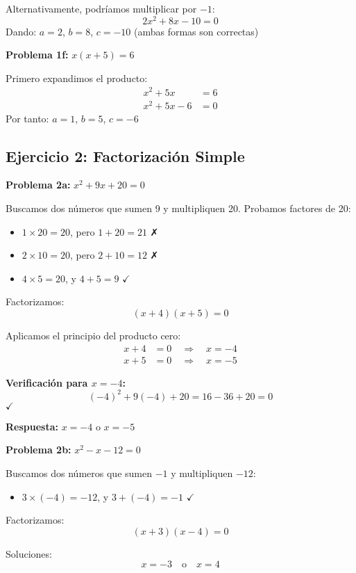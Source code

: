 Alternativamente, podríamos multiplicar por $-1$:
$$2x^2 + 8x - 10 = 0$$
Dando: $a = 2$, $b = 8$, $c = -10$ (ambas formas son correctas)

\textbf{Problema 1f:} $x(x + 5) = 6$

Primero expandimos el producto:
\begin{align}
x^2 + 5x &= 6\\
x^2 + 5x - 6 &= 0
\end{align}
Por tanto: $a = 1$, $b = 5$, $c = -6$


\subsection*{Ejercicio 2: Factorización Simple}

\textbf{Problema 2a:} $x^2 + 9x + 20 = 0$

Buscamos dos números que sumen 9 y multipliquen 20. Probamos factores de 20:
\begin{itemize}
\item $1 \times 20 = 20$, pero $1 + 20 = 21$ ✗
\item $2 \times 10 = 20$, pero $2 + 10 = 12$ ✗
\item $4 \times 5 = 20$, y $4 + 5 = 9$ $\checkmark$
\end{itemize}

Factorizamos:
$$(x + 4)(x + 5) = 0$$

Aplicamos el principio del producto cero:
\begin{align}
x + 4 &= 0 \quad \Rightarrow \quad x = -4\\
x + 5 &= 0 \quad \Rightarrow \quad x = -5
\end{align}

\textbf{Verificación para $x = -4$:}
$$(-4)^2 + 9(-4) + 20 = 16 - 36 + 20 = 0$$ $\checkmark$

\textbf{Respuesta:} $x = -4$ o $x = -5$

\textbf{Problema 2b:} $x^2 - x - 12 = 0$

Buscamos dos números que sumen $-1$ y multipliquen $-12$:
\begin{itemize}
\item $3 \times (-4) = -12$, y $3 + (-4) = -1$ $\checkmark$
\end{itemize}

Factorizamos:
$$(x + 3)(x - 4) = 0$$

Soluciones:
$$x = -3 \quad \text{o} \quad x = 4$$

